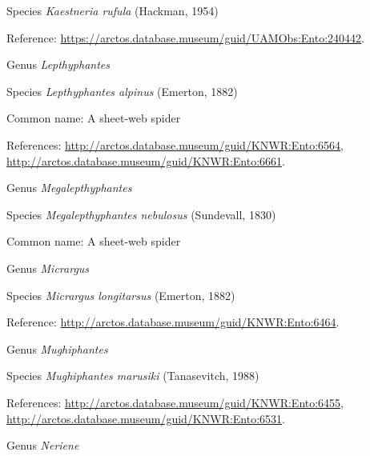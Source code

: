 \documentclass[9pt, article]{memoir}
\begin{document}
\begin{multicols}{2}
\vspace{6pt}\noindent\hspace{36pt}Species \textit{Kaestneria rufula} (Hackman, 1954)


Reference: 
\url{https://arctos.database.museum/guid/UAMObs:Ento:240442}.

\vspace{6pt}\noindent\hspace{30pt}Genus \textit{Lepthyphantes}


\vspace{6pt}\noindent\hspace{36pt}Species \textit{Lepthyphantes alpinus} (Emerton, 1882)


Common name: A sheet-web spider

References: 
\url{http://arctos.database.museum/guid/KNWR:Ento:6564}, 
\url{http://arctos.database.museum/guid/KNWR:Ento:6661}.

\vspace{6pt}\noindent\hspace{30pt}Genus \textit{Megalepthyphantes}


\vspace{6pt}\noindent\hspace{36pt}Species \textit{Megalepthyphantes nebulosus} (Sundevall, 1830)


Common name: A sheet-web spider

\vspace{6pt}\noindent\hspace{30pt}Genus \textit{Micrargus}


\vspace{6pt}\noindent\hspace{36pt}Species \textit{Micrargus longitarsus} (Emerton, 1882)


Reference: 
\url{http://arctos.database.museum/guid/KNWR:Ento:6464}.

\vspace{6pt}\noindent\hspace{30pt}Genus \textit{Mughiphantes}


\vspace{6pt}\noindent\hspace{36pt}Species \textit{Mughiphantes marusiki} (Tanasevitch, 1988)


References: 
\url{http://arctos.database.museum/guid/KNWR:Ento:6455}, 
\url{http://arctos.database.museum/guid/KNWR:Ento:6531}.

\vspace{6pt}\noindent\hspace{30pt}Genus \textit{Neriene}



\end{multicols}
\end{document}
